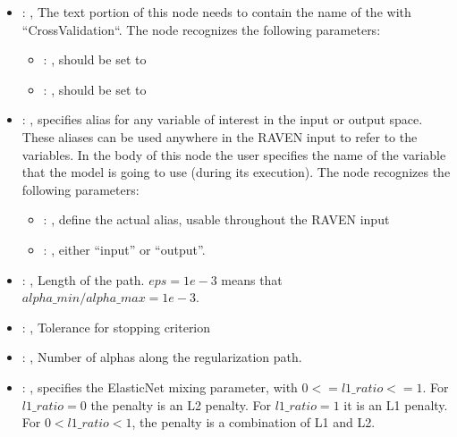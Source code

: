 \begin{itemize}
    \item {}: , 
      The text portion of this node needs to contain the name of the  with
               ``CrossValidation``.
      The  node recognizes the following parameters:
        \begin{itemize}
          \item {}: , 
            should be set to 
          \item {}: , 
            should be set to 
      \end{itemize}

    \item {}: , 
      specifies alias for         any variable of interest in the input or output space. These
      aliases can be used anywhere in the RAVEN input to         refer to the variables. In the body
      of this node the user specifies the name of the variable that the model is going to use
      (during its execution).
      The  node recognizes the following parameters:
        \begin{itemize}
          \item {}: , 
            define the actual alias, usable throughout the RAVEN input
          \item {}: , 
            either ``input'' or ``output''.
      \end{itemize}

    \item {}: , 
      Length of the path. $eps=1e-3$ means that $alpha\_min / alpha\_max = 1e-3$.

    \item {}: , 
      Tolerance for stopping criterion

    \item {}: , 
      Number of alphas along the regularization path.

    \item {}: , 
      specifies the                                                  ElasticNet mixing parameter,
      with $0 <= l1\_ratio <= 1$.                                                  For $l1\_ratio =
      0$ the penalty is an L2 penalty.                                                  For
      $l1\_ratio = 1$ it is an L1 penalty.                                                  For $0 <
      l1\_ratio < 1$, the penalty is a combination of L1 and L2.


\end{itemize}
